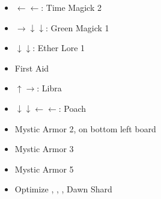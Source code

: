 \begin{liscense}
\begin{itemize}
	\ashef
	\begin{itemize}
		\item $\leftarrow\leftarrow$: Time Magick 2
	\end{itemize}
	\vaanf \rightbb
	\begin{itemize}
		\item $\rightarrow\downarrow\downarrow$: Green Magick 1
	\end{itemize}
	\penelof \leftb
	\begin{itemize}
		\item $\downarrow\downarrow$: Ether Lore 1
	\end{itemize}
	\vaanf \rightb
	\begin{itemize}
		\item First Aid
		\item $\uparrow\rightarrow$: Libra
		\item $\downarrow\downarrow\leftarrow\leftarrow$: Poach
	\end{itemize}
	\ashef \leftbb
	\begin{itemize}
		\item Mystic Armor 2, on bottom left board
	\end{itemize}
	\penelof \rightb
	\begin{itemize}
		\item Mystic Armor 3
	\end{itemize}
	\ashef \leftb
	\begin{itemize}
		\item Mystic Armor 5
	\end{itemize}
\end{itemize}
\end{liscense}
\begin{equip}
\begin{itemize}
\item Optimize \vaan, \penelo, \ashe, \basch
\baschf Dawn Shard
\end{itemize}
\end{equip}
